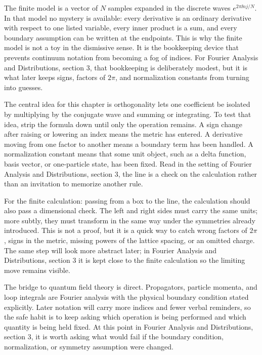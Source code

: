 The finite model is a vector of \(N\) samples expanded in the discrete waves \(e^{2\pi \ii nj/N}\).  In that model no mystery is available: every derivative is an ordinary derivative with respect to one listed variable, every inner product is a sum, and every boundary assumption can be written at the endpoints.  This is why the finite model is not a toy in the dismissive sense.  It is the bookkeeping device that prevents continuum notation from becoming a fog of indices.  For Fourier Analysis and Distributions, section 3, that bookkeeping is deliberately modest, but it is what later keeps signs, factors of \(2\pi\), and normalization constants from turning into guesses.

The central idea for this chapter is orthogonality lets one coefficient be isolated by multiplying by the conjugate wave and summing or integrating.  To test that idea, strip the formula down until only the operation remains.  A sign change after raising or lowering an index means the metric has entered.  A derivative moving from one factor to another means a boundary term has been handled.  A normalization constant means that some unit object, such as a delta function, basis vector, or one-particle state, has been fixed.  Read in the setting of Fourier Analysis and Distributions, section 3, the line is a check on the calculation rather than an invitation to memorize another rule.

For the finite calculation: passing from a box to the line, the calculation should also pass a dimensional check.  The left and right sides must carry the same units; more subtly, they must transform in the same way under the symmetries already introduced.  This is not a proof, but it is a quick way to catch wrong factors of \(2\pi\), signs in the metric, missing powers of the lattice spacing, or an omitted charge.  The same step will look more abstract later; in Fourier Analysis and Distributions, section 3 it is kept close to the finite calculation so the limiting move remains visible.

The bridge to quantum field theory is direct.  Propagators, particle momenta, and loop integrals are Fourier analysis with the physical boundary condition stated explicitly.  Later notation will carry more indices and fewer verbal reminders, so the safe habit is to keep asking which operation is being performed and which quantity is being held fixed.  At this point in Fourier Analysis and Distributions, section 3, it is worth asking what would fail if the boundary condition, normalization, or symmetry assumption were changed.

